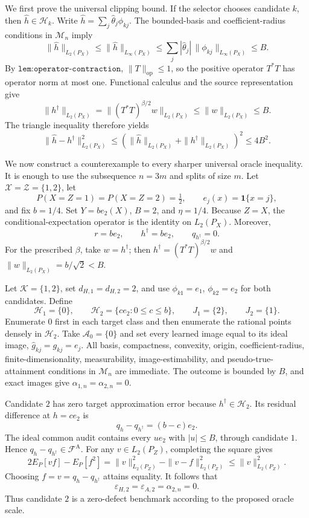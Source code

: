 We first prove the universal clipping bound. If the selector chooses candidate \(k\), then \(\widehat h\in\mathcal H_k\). Write \(\widehat h=\sum_j\widehat\theta_j\phi_{kj}\). The bounded-basis and coefficient-radius conditions in \(\mathcal M_n\) imply
\[
 \|\widehat h\|_{L_2(P_X)}
 \le\|\widehat h\|_{L_\infty(P_X)}
 \le\sum_j|\widehat\theta_j|\,\|\phi_{kj}\|_{L_\infty(P_X)}
 \le B.
\]
By \(\texttt{lem:operator-contraction}\), \(\|T\|_{\mathrm{op}}\le1\), so the positive operator \(T^*T\) has operator norm at most one. Functional calculus and the source representation give
\[
 \|h^\dagger\|_{L_2(P_X)}
 =\|(T^*T)^{\beta/2}w\|_{L_2(P_X)}
 \le\|w\|_{L_2(P_X)}
 \le B.
\]
The triangle inequality therefore yields
\[
 \|\widehat h-h^\dagger\|_{L_2(P_X)}^2
 \le(\|\widehat h\|_{L_2(P_X)}+\|h^\dagger\|_{L_2(P_X)})^2
 \le4B^2.
\]

We now construct a counterexample to every sharper universal oracle inequality. It is enough to use the subsequence \(n=3m\) and splits of size \(m\). Let \(\mathcal X=\mathcal Z=\{1,2\}\), let
\[
 P(X=Z=1)=P(X=Z=2)=\tfrac12,
 \qquad e_j(x)=\mathbf 1\{x=j\},
\]
and fix \(b=1/4\). Set \(Y=b e_2(X)\), \(B=2\), and \(\eta=1/4\). Because \(Z=X\), the conditional-expectation operator is the identity on \(L_2(P_X)\). Moreover,
\[
 r=b e_2,
 \qquad h^\dagger=b e_2,
 \qquad q_{h^\dagger}=0.
\]
For the prescribed \(\beta\), take \(w=h^\dagger\); then \(h^\dagger=(T^*T)^{\beta/2}w\) and \(\|w\|_{L_2(P_X)}=b/\sqrt2<B\).

Let \(\mathcal K=\{1,2\}\), set \(d_{H,1}=d_{H,2}=2\), and use \(\phi_{k1}=e_1\), \(\phi_{k2}=e_2\) for both candidates. Define
\[
 \mathcal H_1=\{0\},
 \qquad
 \mathcal H_2=\{c e_2:0\le c\le b\},
 \qquad
 J_1=\{2\},
 \qquad
 J_2=\{1\}.
\]
Enumerate \(0\) first in each target class and then enumerate the rational points densely in \(\mathcal H_2\). Take \(\mathcal A_0=\{0\}\) and set every learned image equal to its ideal image, \(\widehat g_{kj}=g_{kj}=e_j\). All basis, compactness, convexity, origin, coefficient-radius, finite-dimensionality, measurability, image-estimability, and pseudo-true-attainment conditions in \(\mathcal M_n\) are immediate. The outcome is bounded by \(B\), and exact images give \(\alpha_{1,n}=\alpha_{2,n}=0\).

Candidate \(2\) has zero target approximation error because \(h^\dagger\in\mathcal H_2\). Its residual difference at \(h=c e_2\) is
\[
 q_h-q_{h^\dagger}=(b-c)e_2.
\]
The ideal common audit contains every \(u e_2\) with \(|u|\le B\), through candidate \(1\). Hence \(q_h-q_{h^\dagger}\in\mathcal F^{\mathrm A}\). For any \(v\in L_2(P_Z)\), completing the square gives
\[
 2E_P[vf]-E_P[f^2]=\|v\|_{L_2(P_Z)}^2-\|v-f\|_{L_2(P_Z)}^2
 \le\|v\|_{L_2(P_Z)}^2.
\]
Choosing \(f=v=q_h-q_{h^\dagger}\) attains equality. It follows that
\[
 \varepsilon_{H,2}=\varepsilon_{A,2}=\alpha_{2,n}=0.
\]
Thus candidate \(2\) is a zero-defect benchmark according to the proposed oracle scale.


